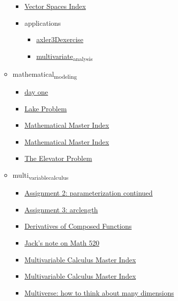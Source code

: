 \documentclass[11pt]{article}
\begin{document}
\begin{itemize}
\begin{itemize}
\begin{itemize}
\item \href{mathematics/linear\_algebra/KBe20math530refVectorSpace.org}{Vector Spaces Index}
\item applications
\begin{itemize}
\item \href{mathematics/linear\_algebra/applications/axler3Dexercise.org}{axler3Dexercise}
\item \href{mathematics/linear\_algebra/applications/multivariate\_analysis.org}{multivariate\textsubscript{analysis}}
\end{itemize}
\end{itemize}
\item mathematical\textsubscript{modeling}
\begin{itemize}
\item \href{mathematics/mathematical\_modeling/KBxDayOneMathMod55.org}{day one}
\item \href{mathematics/mathematical\_modeling/KBxLakeProb.org}{Lake Problem}
\item \href{mathematics/mathematical\_modeling/index.org}{Mathematical Master Index}
\item \href{mathematics/mathematical\_modeling/KBxMathModMasterIndex.org}{Mathematical Master Index}
\item \href{mathematics/mathematical\_modeling/KBxTheElevatorProblem.org}{The Elevator Problem}
\end{itemize}
\item multi\textsubscript{variable}\textsubscript{calculus}
\begin{itemize}
\item \href{mathematics/multi\_variable\_calculus/KBe21math520retAssignment2.org}{Assignment 2: parameterization continued}
\item \href{mathematics/multi\_variable\_calculus/KBe21math520retAssign3.org}{Assignment 3: arclength}
\item \href{mathematics/multi\_variable\_calculus/KBrefDerivativesOfComposedFunctions.org}{Derivatives of Composed Functions}
\item \href{mathematics/multi\_variable\_calculus/KBhMATH520Jack.org}{Jack's note on Math 520}
\item \href{mathematics/multi\_variable\_calculus/index.org}{Multivariable Calculus Master Index}
\item \href{mathematics/multi\_variable\_calculus/KBMATH520MasterIndex.org}{Multivariable Calculus Master Index}
\item \href{mathematics/multi\_variable\_calculus/KBrefLeonardsMultiDimensionalMultiverse.org}{Multiverse: how to think about many dimensions}

\end{itemize}
\end{itemize}
\end{itemize}
\end{document}
